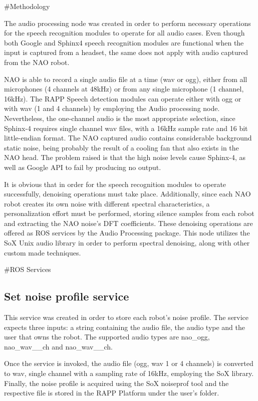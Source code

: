 \#\-Methodology

The audio processing node was created in order to perform necessary operations for the speech recognition modules to operate for all audio cases. Even though both Google and Sphinx4 speech recognition modules are functional when the input is captured from a headset, the same does not apply with audio captured from the N\-A\-O robot.

N\-A\-O is able to record a single audio file at a time (wav or ogg), either from all microphones (4 channels at 48k\-Hz) or from any single microphone (1 channel, 16k\-Hz). The R\-A\-P\-P Speech detection modules can operate either with ogg or with wav (1 and 4 channels) by employing the Audio processing node. Nevertheless, the one-\/channel audio is the most appropriate selection, since Sphinx-\/4 requires single channel wav files, with a 16k\-Hz sample rate and 16 bit little-\/endian format. The N\-A\-O captured audio contains considerable background static noise, being probably the result of a cooling fan that also exists in the N\-A\-O head. The problem raised is that the high noise levels cause Sphinx-\/4, as well as Google A\-P\-I to fail by producing no output.

It is obvious that in order for the speech recognition modules to operate successfully, denoising operations must take place. Additionally, since each N\-A\-O robot creates its own noise with different spectral characteristics, a personalization effort must be performed, storing silence samples from each robot and extracting the N\-A\-O noise’s D\-F\-T coefficients. These denoising operations are offered as R\-O\-S services by the Audio Processing package. This node utilizes the So\-X Unix audio library in order to perform spectral denoising, along with other custom made techniques.

\#\-R\-O\-S Services

\subsection*{Set noise profile service}

This service was created in order to store each robot’s noise profile. The service expects three inputs\-: a string containing the audio file, the audio type and the user that owns the robot. The supported audio types are nao\-\_\-ogg, nao\-\_\-wav\-\_\-\_\-ch and nao\-\_\-wav\-\_\-\_\-ch.

Once the service is invoked, the audio file (ogg, wav 1 or 4 channels) is converted to wav, single channel with a sampling rate of 16k\-Hz, employing the So\-X library. Finally, the noise profile is acquired using the So\-X noiseprof tool and the respective file is stored in the R\-A\-P\-P Platform under the user’s folder.

